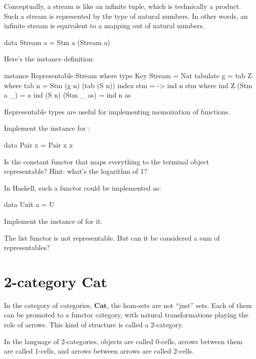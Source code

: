 \documentclass[DaoFP]{subfiles}
\begin{document}
Conceptually, a stream is like an infinite tuple, which is technically a product. Such a stream is represented by the type of natural numbers. In other words, an infinite stream is equivalent to a mapping out of natural numbers. 
\begin{haskell}
data Stream a = Stm a (Stream a)
\end{haskell}
Here's the instance definition:
\begin{haskell}
instance Representable Stream where
  type Key Stream = Nat
  tabulate g = tab Z
    where
      tab n = Stm (g n) (tab (S n))
  index stm = \n -> ind n stm
    where
      ind Z (Stm a _) = a
      ind (S n) (Stm _ as) = ind n as
\end{haskell}
Representable types are useful for implementing  memoization of functions.

\begin{exercise}
Implement the  instance for :
\begin{haskell}
data Pair x = Pair x x
\end{haskell}
\end{exercise}

\begin{exercise}
Is the constant functor that maps everything to the terminal object representable? Hint: what's the logarithm of 1?

In Haskell, such a functor could be implemented as:
\begin{haskell}
data Unit a = U
\end{haskell}
Implement the instance of  for it.
\end{exercise}

\begin{exercise}
The list functor is not representable. But can it be considered a sum of representables?
\end{exercise}

\section{2-category  $\mathbf{Cat}$ }

In the category of categories, $\mathbf{Cat}$, the hom-sets are not ``just'' sets. Each of them can be promoted to a functor category, with natural transformations playing the role of arrows. This kind of structure is called a 2-category. 

In the language of 2-categories, objects are called 0-cells, arrows between them are called 1-cells, and arrows between arrows are called 2-cells. 
\end{document}
